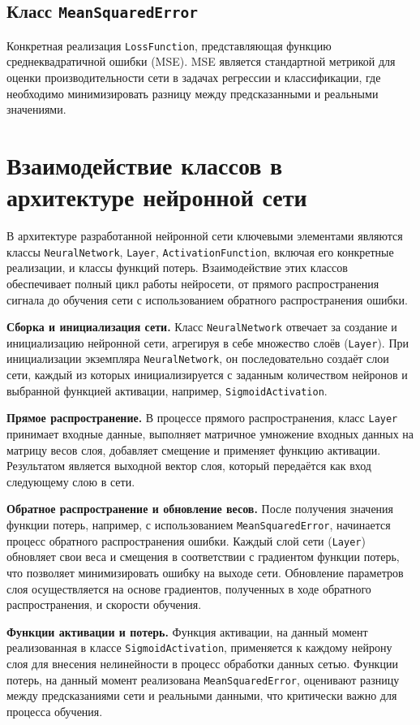 \documentclass{article}
\begin{document}
\subsection{Класс \texttt{MeanSquaredError}}
Конкретная реализация \texttt{LossFunction}, представляющая функцию среднеквадратичной ошибки (MSE). MSE является стандартной метрикой для оценки производительности сети в задачах регрессии и классификации, где необходимо минимизировать разницу между предсказанными и реальными значениями.

\section{Взаимодействие классов в архитектуре нейронной сети}

В архитектуре разработанной нейронной сети ключевыми элементами являются классы \texttt{NeuralNetwork},  \texttt{Layer}, \texttt{ActivationFunction}, включая его конкретные реализации, и классы функций потерь. Взаимодействие этих классов обеспечивает полный цикл работы нейросети, от прямого распространения сигнала до обучения сети с использованием обратного распространения ошибки.

\textbf{Сборка и инициализация сети.} Класс \texttt{NeuralNetwork} отвечает за создание и инициализацию нейронной сети, агрегируя в себе множество слоёв (\texttt{Layer}). При инициализации экземпляра \texttt{NeuralNetwork}, он последовательно создаёт слои сети, каждый из которых инициализируется с заданным количеством нейронов и выбранной функцией активации, например, \texttt{SigmoidActivation}.

\textbf{Прямое распространение.} В процессе прямого распространения, класс \texttt{Layer} принимает входные данные, выполняет матричное умножение входных данных на матрицу весов слоя, добавляет смещение и применяет функцию активации. Результатом является выходной вектор слоя, который передаётся как вход следующему слою в сети.

\textbf{Обратное распространение и обновление весов.} После получения значения функции потерь, например, с использованием \texttt{MeanSquaredError}, начинается процесс обратного распространения ошибки. Каждый слой сети (\texttt{Layer}) обновляет свои веса и смещения в соответствии с градиентом функции потерь, что позволяет минимизировать ошибку на выходе сети. Обновление параметров слоя осуществляется на основе градиентов, полученных в ходе обратного распространения, и скорости обучения.

\textbf{Функции активации и потерь.} Функция активации, на данный момент реализованная в классе \newline \texttt{SigmoidActivation}, применяется к каждому нейрону слоя для внесения нелинейности в процесс обработки данных сетью. Функции потерь, на данный момент реализована \texttt{MeanSquaredError}, оценивают разницу между предсказаниями сети и реальными данными, что критически важно для процесса обучения.
\end{document}

